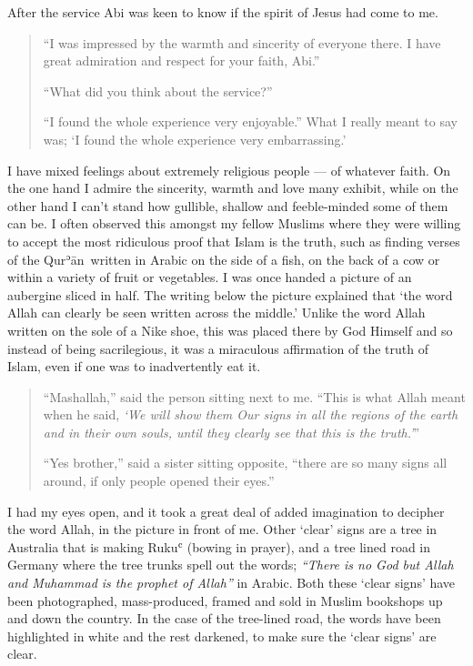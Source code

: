\documentclass[12pt]{memoir}
\def\´{ʾ} %
\def\`{ʿ} %
\newcommand{\cor}[2]{#2} %
\def \Quran{Qur\-\´ān} %
\def\–{-\hskip0pt}
\begin{document}
After the service Abi was keen to know if the spirit of Jesus had come to me.

\begin{quote}
“I was impressed by the warmth and sincerity of everyone there.
I have great admiration and respect for your faith, Abi.”

“What did you think about the service?”

“I found the whole experience very enjoyable.”
What I really meant to say was;
‘I found the whole experience very embarrassing.’
\end{quote}

I have mixed feelings about extremely religious people — of whatever faith.
On the one hand I admire the sincerity, warmth and love many exhibit,
while on the other hand I can’t stand how gullible,
shallow and feeble\–minded some of them can be.
I often observed this amongst my fellow Muslims where they were willing
to accept the most ridiculous proof that Islam is the truth,
such as finding verses of the \Quran\ written in Arabic on the side of a fish,
on the back of a cow or within a variety of fruit or vegetables.
I was once handed a picture of an aubergine sliced in half.
The writing below the picture explained that
‘the word Allah can clearly be seen written across the middle.’
Unlike the word Allah written on the sole of a Nike shoe,
this was placed there by God Himself and so instead of being sacrilegious,
it was a miraculous affirmation of the truth of Islam,
even if one was to inadvertently eat it.

\begin{quote}
“Mashallah,” said the person sitting next to me.
“This is what Allah meant when he said,
\emph{‘We will show them Our signs in all the regions of the earth
and in their own souls, until they clearly see that this is the truth.’}”

“Yes brother,” said a sister sitting opposite,
“there are so many signs all around,
if only people \cor{open}{opened} their eyes.”
\end{quote}

I had my eyes open, and it took a great deal of added imagination
to decipher the word Allah, in the picture in front of me.
Other ‘clear’ signs are a tree in Australia that is making Ruku\`
(bowing in prayer), and a tree lined road in Germany
where the tree trunks spell out the words;
\emph{“There is no God but Allah and Muhammad is the prophet of Allah”}
in Arabic.
Both these ‘clear signs’ have been photographed, mass\–produced,
framed and sold in Muslim bookshops up and down the country.
In the case of the tree\–lined road, the words have been highlighted
in white and the rest darkened, to make sure the ‘clear signs’ are clear.
\end{document}

